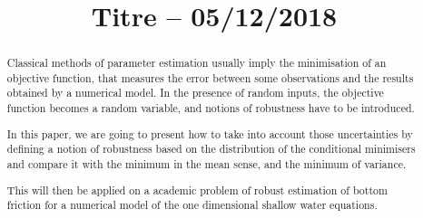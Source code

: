 \documentclass[npg, manuscript]{copernicus}
\begin{document}
\title{Titre -- 05/12/2018}%













\received{}
\pubdiscuss{} %
\revised{}
\accepted{}
\published{}




\maketitle


\begin{abstract}
Classical methods of parameter estimation usually imply the minimisation of an objective function, that measures the error between some observations and the results obtained by a numerical model. In the presence of random inputs, the objective function becomes a random variable, and notions of robustness have to be introduced.

In this paper, we are going to present how to take into account those uncertainties by defining a notion of robustness based on the distribution of the conditional minimisers and compare it with the minimum in the mean sense, and the minimum of variance.

This will then be applied on a academic problem of robust estimation of bottom friction for a numerical model of the one dimensional shallow water equations.
\end{abstract}


\listoftodos{}
\end{document}
